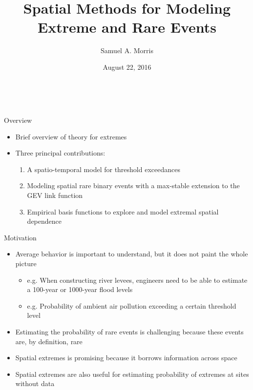 \documentclass{beamer}
\title[Spatial methods for EVA] %
{
  Spatial Methods for Modeling Extreme and Rare Events
}
\author[S. Morris]{Samuel A. Morris}
\institute[]{North Carolina State University}
\date[]{August 22, 2016}
\begin{document}
\begin{frame}{\ }
\begin{center}
  \maketitle
\end{center}
\end{frame}


\begin{frame}{Overview}
	\begin{itemize} \setlength{\itemsep}{1em}
		\item Brief overview of theory for extremes
		\item Three principal contributions:
		\begin{enumerate}[1.]\setlength{\itemsep}{0.5em}
			\item A spatio-temporal \skewt{} model for threshold exceedances
			\item Modeling spatial rare binary events with a max-stable extension to the GEV link function
			\item Empirical basis functions to explore and model extremal spatial dependence
		\end{enumerate}
	\end{itemize}
\end{frame}

\begin{frame}{Motivation}
  \begin{itemize} \setlength{\itemsep}{1em}
    \item Average behavior is important to understand, but it does not paint the whole picture
    \begin{itemize}
      \item e.g. When constructing river levees, engineers need to be able to estimate a 100-year or 1000-year flood levels
      \item e.g. Probability of ambient air pollution exceeding a certain threshold level
    \end{itemize}
    \item Estimating the probability of rare events is challenging because these events are, by definition, rare
    \item Spatial extremes is promising because it borrows information across space
    \item Spatial extremes are also useful for estimating probability of extremes at sites without data
  \end{itemize}
\end{frame}
\end{document}
